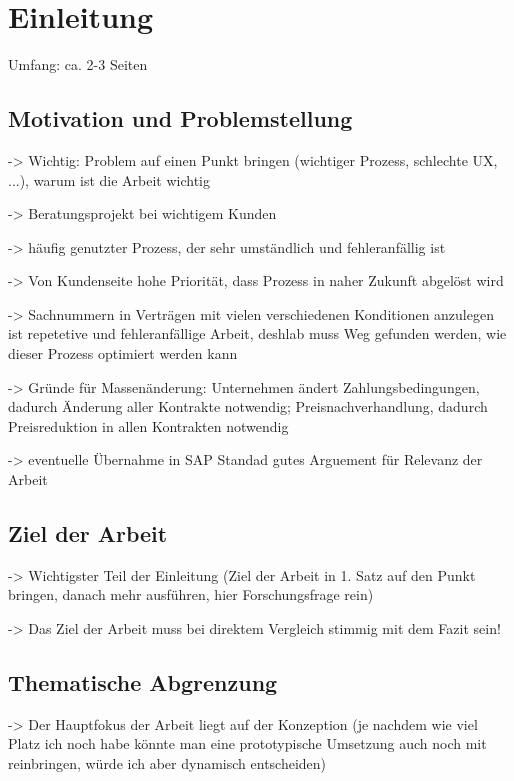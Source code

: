 \chapter{Einleitung}

Umfang: ca. 2-3 Seiten

\section{Motivation und Problemstellung}

-> Wichtig: Problem auf einen Punkt bringen (wichtiger Prozess, schlechte UX, ...), warum ist die Arbeit wichtig

-> Beratungsprojekt bei wichtigem Kunden

-> häufig genutzter Prozess, der sehr umständlich und fehleranfällig ist

-> Von Kundenseite hohe Priorität, dass Prozess in naher Zukunft abgelöst wird

-> Sachnummern in Verträgen mit vielen verschiedenen Konditionen anzulegen ist repetetive und fehleranfällige Arbeit, deshlab muss Weg gefunden werden, wie dieser Prozess optimiert werden kann

-> Gründe für Massenänderung: Unternehmen ändert Zahlungsbedingungen, dadurch Änderung aller Kontrakte notwendig; Preisnachverhandlung, dadurch Preisreduktion in allen Kontrakten notwendig

-> eventuelle Übernahme in SAP Standad gutes Arguement für Relevanz der Arbeit

\section{Ziel der Arbeit}

-> Wichtigster Teil der Einleitung (Ziel der Arbeit in 1. Satz auf den Punkt bringen, danach mehr ausführen, hier Forschungsfrage rein)

-> Das Ziel der Arbeit muss bei direktem Vergleich stimmig mit dem Fazit sein!


\section{Thematische Abgrenzung}

-> Der Hauptfokus der Arbeit liegt auf der Konzeption (je nachdem wie viel Platz ich noch habe könnte man eine prototypische Umsetzung auch noch mit reinbringen, würde ich aber dynamisch entscheiden)


